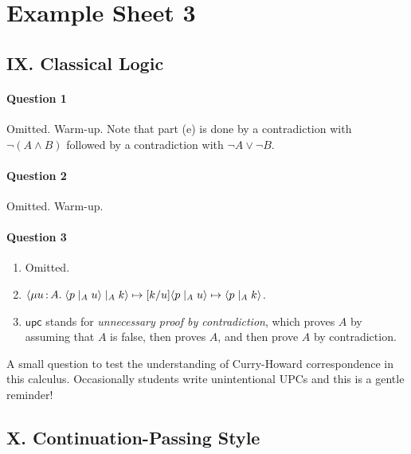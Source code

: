 \documentclass[11pt,a4paper,twoside]{article}
\begin{document}
\section*{Example Sheet 3}

\subsection*{IX. Classical Logic}

\paragraph*{Question 1} Omitted. Warm-up. Note that part (e) is done by a contradiction
with $\neg (A \land B)$ followed by a contradiction with $\neg A \lor \neg B$.

\paragraph*{Question 2} Omitted. Warm-up. 

\paragraph*{Question 3}
\begin{enumerate}[label=(\alph*)]
  \item Omitted.
  \item $\langle \mu u \,{:}\, A .\; \langle p \mid_{A} u \rangle \mid_{A} k \rangle \mapsto [k / u] \langle p \mid_{A} u \rangle
  \mapsto \langle p \mid_{A} k \rangle$.
  \item $\mathsf{upc}$ stands for \emph{unnecessary proof by contradiction}, which 
    proves $A$ by assuming that $A$ is false, then proves $A$, and then prove $A$
    by contradiction. 
\end{enumerate}
%
A small question to test the understanding of Curry-Howard correspondence
in this calculus. Occasionally students write unintentional UPCs and this
is a gentle reminder!

\subsection*{X. Continuation-Passing Style}
\end{document}
